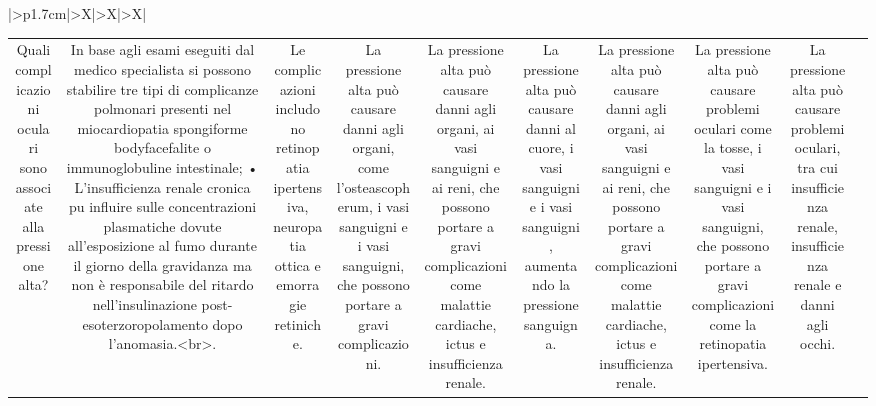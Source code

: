 \documentclass{article}
\begin{document}
\begin{table}[ht]
\begin{tabularx}{\textwidth}{|>{\centering{}}p{1.7cm}|>{\centering\arraybackslash}X|>{\centering\arraybackslash}X|>{\centering\arraybackslash}X|}
\begin{tabular}{|c|c|c|c|c|c|c|c|c|c|}
Quali complicazioni oculari sono associate alla pressione alta? & In base agli esami eseguiti dal medico specialista si possono stabilire tre tipi di complicanze polmonari presenti nel miocardiopatia spongiforme bodyfacefalite o immunoglobuline intestinale; • L'insufficienza renale cronica puٍ influire sulle concentrazioni plasmatiche dovute all'esposizione al fumo durante il giorno della gravidanza ma non è responsabile del ritardo nell'insulinazione post-esoterzoropolamento dopo l'anomasia.<br>. & Le complicazioni includono retinopatia ipertensiva, neuropatia ottica e emorragie retiniche. & La pressione alta può causare danni agli organi, come l'osteascopherum, i vasi sanguigni e i vasi sanguigni, che possono portare a gravi complicazioni. & La pressione alta può causare danni agli organi, ai vasi sanguigni e ai reni, che possono portare a gravi complicazioni come malattie cardiache, ictus e insufficienza renale. & La pressione alta può causare danni al cuore, i vasi sanguigni e i vasi sanguigni, aumentando la pressione sanguigna. & La pressione alta può causare danni agli organi, ai vasi sanguigni e ai reni, che possono portare a gravi complicazioni come malattie cardiache, ictus e insufficienza renale. & La pressione alta può causare problemi oculari come la tosse, i vasi sanguigni e i vasi sanguigni, che possono portare a gravi complicazioni come la retinopatia ipertensiva. & La pressione alta può causare problemi oculari, tra cui insufficienza renale, insufficienza renale e danni agli occhi. \\

\end{tabular}
\end{tabularx}
\end{table}
\end{document}
